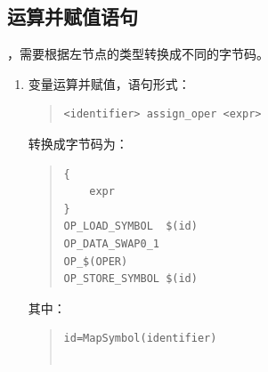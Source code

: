 \subsection{运算并赋值语句}
，需要根据左节点的类型转换成不同的字节码。
\begin{enumerate}
\item 变量运算并赋值，语句形式：
\begin{quote}
\begin{verbatim}
<identifier> assign_oper <expr>
\end{verbatim}
\end{quote}
转换成字节码为：
\begin{quote}
\begin{verbatim}
{
    expr 
}
OP_LOAD_SYMBOL  $(id)
OP_DATA_SWAP0_1
OP_$(OPER)
OP_STORE_SYMBOL $(id)
\end{verbatim}
\end{quote}
其中：
\begin{quote}
\begin{verbatim}
id=MapSymbol(identifier)


\end{verbatim}
\end{quote}
\end{enumerate}
